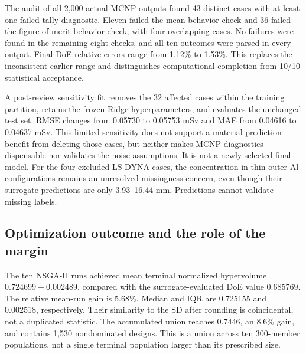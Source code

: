\documentclass[12pt]{elsarticle}
\begin{document}
The audit of all 2,000 actual MCNP outputs found 43 distinct cases with at least one failed tally diagnostic. Eleven failed the mean-behavior check and 36 failed the figure-of-merit behavior check, with four overlapping cases. No failures were found in the remaining eight checks, and all ten outcomes were parsed in every output. Final DoE relative errors range from 1.12\% to 1.53\%. This replaces the inconsistent earlier range and distinguishes computational completion from 10/10 statistical acceptance.

A post-review sensitivity fit removes the 32 affected cases within the training partition, retains the frozen Ridge hyperparameters, and evaluates the unchanged test set. RMSE changes from 0.05730 to 0.05753 mSv and MAE from 0.04616 to 0.04637 mSv. This limited sensitivity does not support a material prediction benefit from deleting those cases, but neither makes MCNP diagnostics dispensable nor validates the noise assumptions. It is not a newly selected final model. For the four excluded LS-DYNA cases, the concentration in thin outer-Al configurations remains an unresolved missingness concern, even though their surrogate predictions are only 3.93--16.44 mm. Predictions cannot validate missing labels.

\subsection{Optimization outcome and the role of the margin}
The ten NSGA-II runs achieved mean terminal normalized hypervolume $0.724699\pm0.002489$, compared with the surrogate-evaluated DoE value 0.685769. The relative mean-run gain is 5.68\%. Median and IQR are 0.725155 and 0.002518, respectively. Their similarity to the SD after rounding is coincidental, not a duplicated statistic. The accumulated union reaches 0.7446, an 8.6\% gain, and contains 1,530 nondominated designs. This is a union across ten 300-member populations, not a single terminal population larger than its prescribed size.
\end{document}
